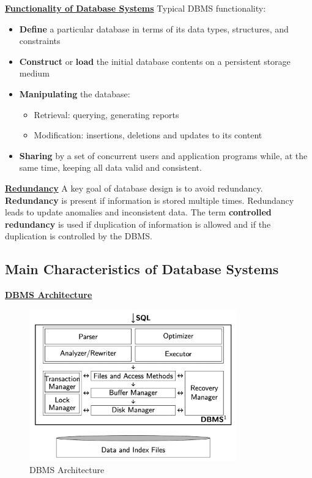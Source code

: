 \textbf{\underline{Functionality of Database Systems}}
\bigskip
Typical DBMS functionality:
\begin{itemize}[label=\(\rhd\)]
    \item \textbf{Define} a particular database in terms of its data types, structures, and constraints
    \item \textbf{Construct} or \textbf{load} the initial database contents on a persistent storage medium
    \item \textbf{Manipulating} the database:
    \begin{itemize}[label=\(\rhd\)]
        \item Retrieval: querying, generating reports
        \item Modification: insertions, deletions and updates to its content
    \end{itemize}
    \item \textbf{Sharing} by a set of concurrent users and application programs while, at the same time, keeping all data valid and consistent.
\end{itemize}

\textbf{\underline{Redundancy}}
\bigskip
A key goal of database design is to avoid redundancy. \textbf{Redundancy} is present if information is stored multiple times. Redundancy leads to update anomalies and inconsistent data. The term \textbf{controlled redundancy} is used if duplication of information is allowed and if the duplication is controlled by the DBMS.

\subsection{Main Characteristics of Database Systems}

\textbf{\underline{DBMS Architecture}}

\begin{figure}[H]
\centering
\includegraphics[width=0.8\textwidth]{images/Screenshot 2024-05-01 at 17.25.40.jpg}
\caption{DBMS Architecture}
\end{figure}

